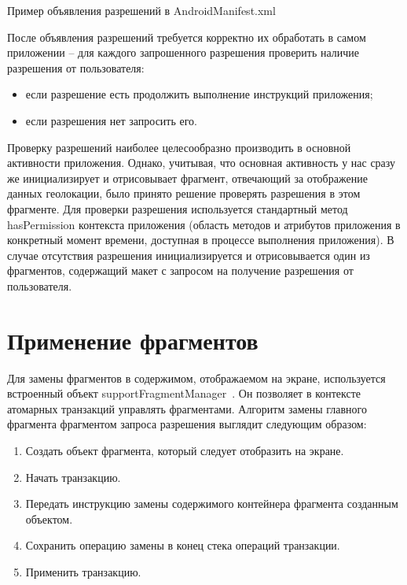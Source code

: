 \smallskip
\begin{ListingEnv}[H]
	\caption{Пример объявления разрешений в AndroidManifest.xml}
	\UseRawInputEncoding
	\footnotesize
	
	\label{list:manifest_permissions}
\end{ListingEnv}


После объявления разрешений требуется корректно их обработать в самом приложении – для каждого запрошенного разрешения проверить наличие разрешения от пользователя:
\begin{itemize}
	\item если разрешение есть \textendash\space продолжить выполнение инструкций приложения;
	\item если разрешения нет \textendash\space запросить его.
\end{itemize}
\smallskip


Проверку разрешений наиболее целесообразно производить в основной активности приложения. Однако, учитывая, что основная активность у нас сразу же инициализирует и отрисовывает фрагмент, отвечающий за отображение данных геолокации, было принято решение проверять разрешения в этом фрагменте.
Для проверки разрешения используется стандартный метод hasPermission контекста приложения (область методов и атрибутов приложения в конкретный момент времени, доступная в процессе выполнения приложения). 
В случае отсутствия разрешения инициализируется и отрисовывается один из фрагментов, содержащий макет с запросом на получение разрешения от пользователя. 

\section{Применение фрагментов}
Для замены фрагментов в содержимом, отображаемом на экране, используется встроенный объект supportFragmentManager~\autocite{android_fragment_manager}. Он позволяет в контексте атомарных транзакций управлять фрагментами. Алгоритм замены главного фрагмента фрагментом запроса разрешения выглядит следующим образом:
\begin{enumerate}
	\item Создать объект фрагмента, который следует отобразить на экране.
	\item Начать транзакцию.
	\item Передать инструкцию замены содержимого контейнера фрагмента созданным объектом.
	\item Сохранить операцию замены в конец стека операций транзакции.
	\item Применить транзакцию.
\end{enumerate}


